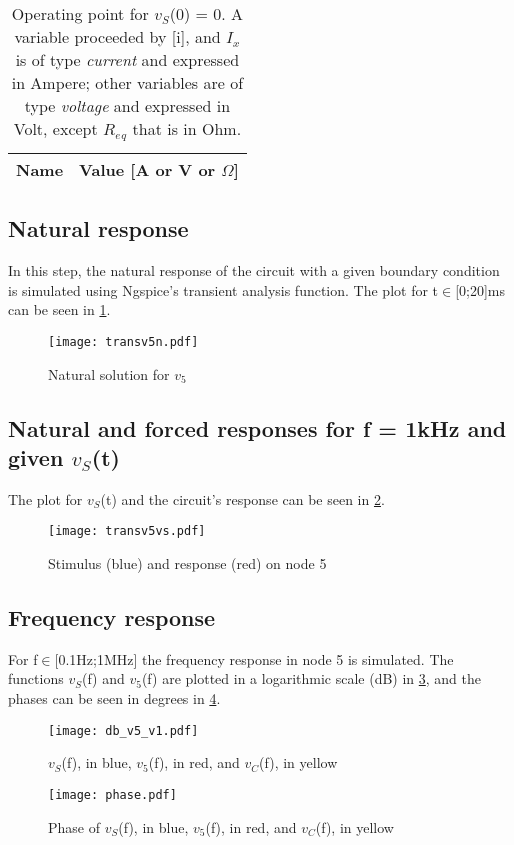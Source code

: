 \begin{table}[h]
  \centering
  \begin{tabular}{|l|r|}
    \hline    
    {\bf Name} & {\bf Value [A or V or $\Omega$]} \\ \hline
    
  \end{tabular}
  \caption{Operating point for $v_S$(0) = 0. A variable proceeded by [i], and $I_x$ is of type {\em current}
    and expressed in Ampere; other variables are of type {\it voltage} and expressed in
    Volt, except $R_e$$_q$ that is in Ohm.}
  \label{tab:op_2}
\end{table}
\FloatBarrier

\subsection{Natural response}

In this step, the natural response of the circuit with a given boundary condition is simulated using Ngspice's transient analysis function. The plot for t$\in$[0;20]ms can be seen in \ref{fig:v5_ng}. 

\begin{figure}[h] \centering
\texttt{[image: transv5n.pdf]}
\caption{Natural solution for $v_5$}
\label{fig:v5_ng}
\end{figure}
\FloatBarrier

\subsection{Natural and forced responses for f = 1kHz and given $v_S$(t)}

The plot for $v_S$(t) and the circuit's response can be seen in \ref{fig:transv5vs.pdf}.

\begin{figure}[h] \centering
\texttt{[image: transv5vs.pdf]}
\caption{Stimulus (blue) and response (red) on node 5}
\label{fig:transv5vs.pdf}
\end{figure}
\FloatBarrier


\subsection{Frequency response}

For f$\in$[0.1Hz;1MHz] the frequency response in node 5 is simulated. The functions $v_S$(f) and $v_5$(f) are plotted in a logarithmic scale (dB) in \ref{fig:db_v5_v1.pdf}, and the phases can be seen in degrees in \ref{fig:phase.pdf}. 

\begin{figure}[h] \centering
\texttt{[image: db\_v5\_v1.pdf]}
\caption{$v_S$(f), in blue, $v_5$(f), in red, and $v_C$(f), in yellow}
\label{fig:db_v5_v1.pdf}
\end{figure}
\FloatBarrier

\begin{figure}[h] \centering
\texttt{[image: phase.pdf]}
\caption{Phase of $v_S$(f), in blue, $v_5$(f), in red, and $v_C$(f), in yellow}
\label{fig:phase.pdf}
\end{figure}
\FloatBarrier
